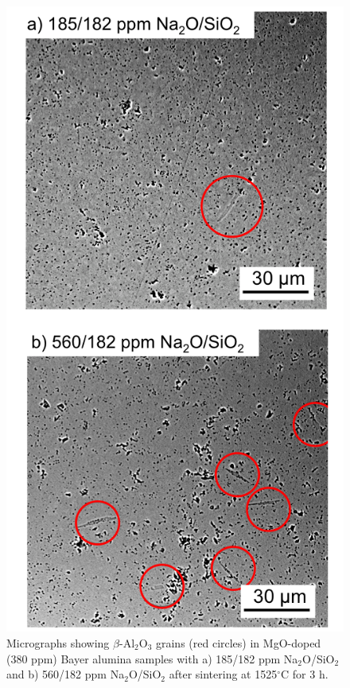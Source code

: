 \newpage
\begin{figure}[H]
	\centering
	\includegraphics{Chapter-5/Figures/Figure7.png}
	\caption{Micrographs showing $\beta$-Al$_{2}$O$_{3}$ grains (red circles) in MgO-doped (380 ppm) Bayer alumina samples with a) 185/182 ppm Na$_{2}$O/SiO$_{2}$ and b) 560/182 ppm Na$_{2}$O/SiO$_{2}$ after sintering at 1525$^{\circ}$C for 3 h.}
	\label{Ch5-figure:Figure7}
\end{figure}

